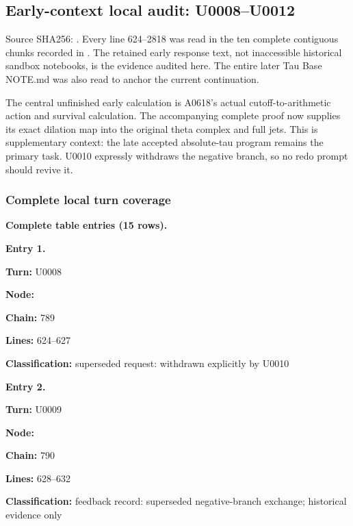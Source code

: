 \documentclass[10pt,a4paper,oneside]{report}
\begin{document}
\subsection{Early-context local audit:
U0008--U0012}\label{early-context-local-audit-u0008u0012}

Source SHA256:
\protect{}.
Every line 624--2818 was read in the ten complete contiguous chunks
recorded in \protect{}. The retained early response
text, not inaccessible historical sandbox notebooks, is the evidence
audited here. The entire later Tau Base NOTE.md was also read to anchor
the current continuation.

The central unfinished early calculation is A0618's actual
cutoff-to-arithmetic action and survival calculation. The accompanying
complete proof now supplies its exact dilation map into the original
theta complex and full jets. This is supplementary context: the late
accepted absolute-tau program remains the primary task. U0010 expressly
withdraws the negative branch, so no redo prompt should revive it.

\subsubsection{Complete local turn
coverage}\label{complete-local-turn-coverage}

\textbf{Complete table entries (15 rows).}


\textbf{Entry 1.}

\textbf{Turn:} U0008

\textbf{Node:} \protect{}

\textbf{Chain:} 789

\textbf{Lines:} 624--627

\textbf{Classification:} superseded request: withdrawn explicitly by
U0010


\textbf{Entry 2.}

\textbf{Turn:} U0009

\textbf{Node:} \protect{}

\textbf{Chain:} 790

\textbf{Lines:} 628--632

\textbf{Classification:} feedback record: superseded negative-branch
exchange; historical evidence only
\end{document}
